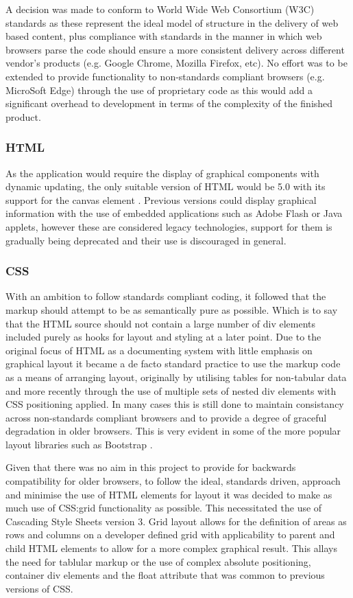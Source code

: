 \documentclass[twoside]{bhamthesis}
\begin{document}
A decision was made to conform to World Wide Web Consortium (W3C) standards as these represent the ideal model of structure in the delivery of web based content, plus compliance with standards in the manner in which web browsers parse the code should ensure a more consistent delivery across different vendor's products (e.g. Google Chrome, Mozilla Firefox, etc). No effort was to be extended to provide functionality to non-standards compliant browsers (e.g. MicroSoft Edge) through the use of proprietary code as this would add a significant overhead to development in terms of the complexity of the finished product.


\subsubsection{HTML}
As the application would require the display of graphical components with dynamic updating, the only suitable version of HTML would be 5.0 with its support for the canvas element \cite{the_world_wide_web_consortium_w3c_html5_2014}. Previous versions could display graphical information with the use of embedded applications such as Adobe Flash or Java applets, however these are considered legacy technologies, support for them is gradually being deprecated \cite{adobe_corporate_communications_flash_2017} and their use is discouraged in general.

\subsubsection{CSS}
With an ambition to follow standards compliant coding, it followed that the markup should attempt to be as semantically pure as possible. Which is to say that the HTML source should not contain a large number of div elements included purely as hooks for layout and styling at a later point. Due to the original focus of HTML as a documenting system with little emphasis on graphical layout it became a de facto standard practice to use the markup code as a means of arranging layout, originally by utilising tables for non-tabular data and more recently through the use of multiple sets of nested div elements with CSS positioning applied. In many cases this is still done to maintain consistancy across non-standards compliant browsers and to provide a degree of graceful degradation in older browsers. This is very evident in some of the more popular layout libraries such as Bootstrap \cite {otto_get_????}.

Given that there was no aim in this project to provide for backwards compatibility for older browsers, to follow the ideal, standards driven, approach and minimise the use of HTML elements for layout it was decided to make as much use of CSS:grid functionality as possible. This necessitated the use of Cascading Style Sheets version 3. Grid layout allows for the definition of areas as rows and columns on a developer defined grid with applicability to parent and child HTML elements to allow for a more complex graphical result. This allays the need for tablular markup or the use of complex absolute positioning, container div elements and the float attribute that was common to previous versions of CSS.
\end{document}
